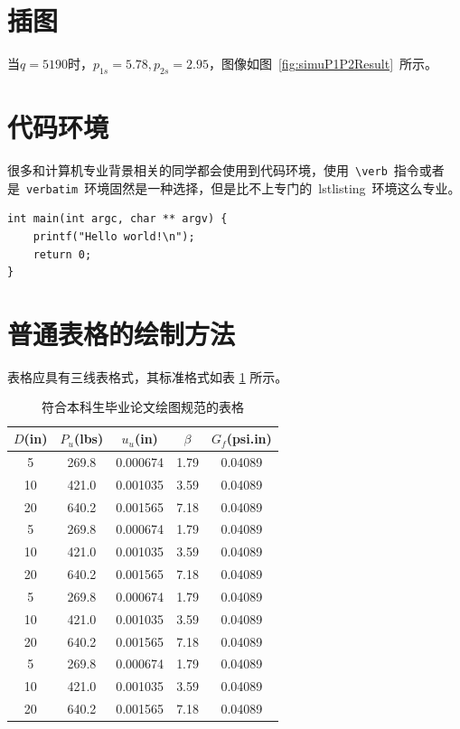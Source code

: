\section{插图}

当$q=5190$时，$p_{1s}=5.78,p_{2s}=2.95$，图像如图~\ref{fig:simuP1P2Result}~所示。

\section{代码环境}

很多和计算机专业背景相关的同学都会使用到代码环境，使用~\verb|\verb|~指令或者是~\verb|verbatim|~环境固然是一种选择，但是比不上专门的~lstlisting~环境这么专业。

\begin{lstlisting}
int main(int argc, char ** argv) {
    printf("Hello world!\n");
    return 0;
}
\end{lstlisting}

\section{普通表格的绘制方法}

表格应具有三线表格式，其标准格式如表 \ref{tab:table1} 所示。
\begin{table}[htbp]
\caption{符合本科生毕业论文绘图规范的表格}\label{tab:table1}
\vspace{0.5em}\centering\wuhao
\begin{tabular}{ccccc}
\toprule[1.5pt]
$D$(in) & $P_u$(lbs) & $u_u$(in) & $\beta$ & $G_f$(psi.in)\\
\midrule[1pt]
 5 & 269.8 & 0.000674 & 1.79 & 0.04089\\
10 & 421.0 & 0.001035 & 3.59 & 0.04089\\
20 & 640.2 & 0.001565 & 7.18 & 0.04089\\
 5 & 269.8 & 0.000674 & 1.79 & 0.04089\\
10 & 421.0 & 0.001035 & 3.59 & 0.04089\\
20 & 640.2 & 0.001565 & 7.18 & 0.04089\\
 5 & 269.8 & 0.000674 & 1.79 & 0.04089\\
10 & 421.0 & 0.001035 & 3.59 & 0.04089\\
20 & 640.2 & 0.001565 & 7.18 & 0.04089\\
 5 & 269.8 & 0.000674 & 1.79 & 0.04089\\
10 & 421.0 & 0.001035 & 3.59 & 0.04089\\
20 & 640.2 & 0.001565 & 7.18 & 0.04089\\
\bottomrule[1.5pt]
\end{tabular}
\vspace{\baselineskip}
\end{table}
